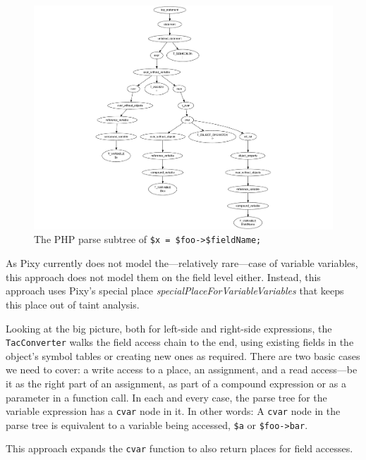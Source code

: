 \begin{figure}[htb]
  \begin{center}
    \includegraphics[scale=.9, trim=60mm 0mm 0mm 0mm]{images/variable-field-access-right}
    \caption{The PHP parse subtree of \texttt{\$x = \$foo->\$fieldName;}}
    \label{fig:variable-field-access-right}
  \end{center}
\end{figure}

As Pixy currently does not model the---relatively rare---case of variable variables, this approach does not model them on the field level either. Instead, this approach uses Pixy's special place \emph{specialPlaceForVariableVariables} that keeps this place out of taint analysis.

Looking at the big picture, both for left-side and right-side expressions, the \texttt{TacConverter} walks the field access chain to the end, using existing fields in the object's symbol tables or creating new ones as required. There are two basic cases we need to cover: a write access to a place, \ie an assignment, and a read access---be it as the right part of an assignment, as part of a compound expression or as a parameter in a function call. In each and every case, the parse tree for the variable expression has a \texttt{cvar} node in it. In other words: A \texttt{cvar} node in the parse tree is equivalent to a variable being accessed, \eg \texttt{\$a} or \texttt{\$foo->bar}.

This approach expands the \texttt{cvar} function to also return places for field accesses.

